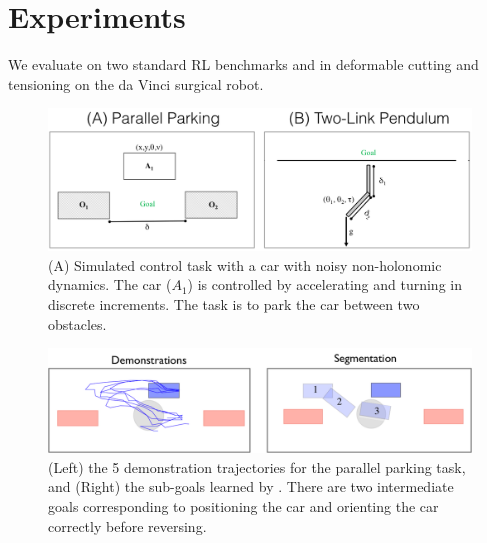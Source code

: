%

\section{Experiments}\label{sec:exp}
We evaluate \hirl on two standard RL benchmarks and in deformable cutting and tensioning on the da Vinci surgical robot.

\begin{figure}[t]
\centering
 \includegraphics[width=\columnwidth]{figures/domains.png}
 \caption{(A) Simulated control task with a car with noisy non-holonomic dynamics. The car ($A_1$) is controlled by accelerating and turning in discrete increments. The task is to park the car between two obstacles. \label{domains}}
\end{figure}

\begin{figure}[t]
\centering
 \includegraphics[width=\columnwidth]{exp/rc-car-segmentation.png}
 \caption{(Left) the 5 demonstration trajectories for the parallel parking task, and (Right) the sub-goals learned by \hirl. There are two intermediate goals corresponding to positioning the car and orienting the car correctly before reversing. \label{exp:rcsegmentation}}
\end{figure}

